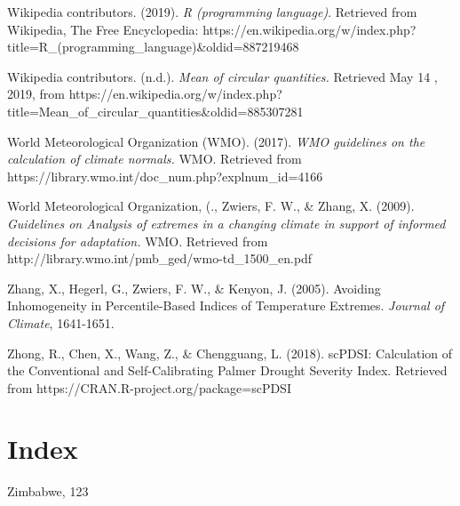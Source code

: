 \documentclass[
  letterpaper,
  DIV=11,
  numbers=noendperiod]{scrreprt}
\begin{document}
Wikipedia contributors. (2019). \emph{R (programming language)}.
Retrieved from Wikipedia, The Free Encyclopedia:
https://en.wikipedia.org/w/index.php?title=R\_(programming\_language)\&oldid=887219468

Wikipedia contributors. (n.d.). \emph{Mean of circular quantities.}
Retrieved May 14 , 2019, from
https://en.wikipedia.org/w/index.php?title=Mean\_of\_circular\_quantities\&oldid=885307281

World Meteorological Organization (WMO). (2017). \emph{WMO guidelines on
the calculation of climate normals.} WMO. Retrieved from
https://library.wmo.int/doc\_num.php?explnum\_id=4166

World Meteorological Organization, (., Zwiers, F. W., \& Zhang, X.
(2009). \emph{Guidelines on Analysis of extremes in a changing climate
in support of informed decisions for adaptation.} WMO. Retrieved from
http://library.wmo.int/pmb\_ged/wmo-td\_1500\_en.pdf

Zhang, X., Hegerl, G., Zwiers, F. W., \& Kenyon, J. (2005). Avoiding
Inhomogeneity in Percentile-Based Indices of Temperature Extremes.
\emph{Journal of Climate}, 1641-1651.

Zhong, R., Chen, X., Wang, Z., \& Chengguang, L. (2018). scPDSI:
Calculation of the Conventional and Self-Calibrating Palmer Drought
Severity Index. Retrieved from https://CRAN.R-project.org/package=scPDSI


\chapter{Index}\label{index}

Zimbabwe, 123
\end{document}
